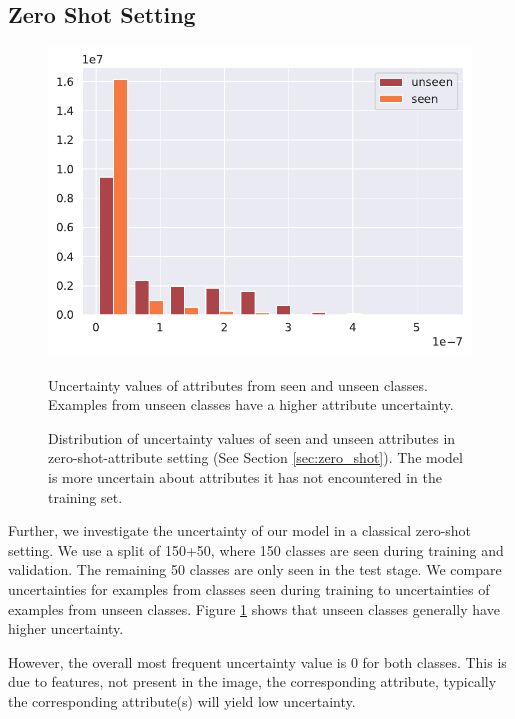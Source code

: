 \documentclass[a4paper,cleardoubleempty,BCOR1cm, 11pt]{report}
\begin{document}
\subsection{Zero Shot Setting}
\begin{figure}[t!]
	\centering
	\begin{minipage}[t]{0.45\textwidth}
		\centering
		\includegraphics[width=1\textwidth]{images/zero_shot_class_uncertainty_hist.pdf} 
		\caption{Uncertainty values of attributes from seen and unseen classes. Examples from unseen classes have a higher attribute uncertainty.}
		\label{fig:unseen_classes}
	\end{minipage}\hfill
	\begin{minipage}[t]{0.45\textwidth}
		\centering
		\caption{Distribution of uncertainty values of seen and unseen attributes in zero-shot-attribute setting (See Section \ref{sec:zero_shot}). The model is more uncertain about attributes it has not encountered in the training set.}
	\end{minipage}
\end{figure}
Further, we investigate the uncertainty of our model in a classical zero-shot setting. We use a split of 150+50, where 150 classes are seen during training and validation. The remaining 50 classes are only seen in the test stage. We compare uncertainties for examples from classes seen during training to uncertainties of examples from unseen classes. Figure \ref{fig:unseen_classes} shows that unseen classes generally have higher uncertainty.

However, the overall most frequent uncertainty value is 0 for both classes. This is due to features, not present in the image, the corresponding attribute, typically the corresponding attribute(s) will yield low uncertainty.
\end{document}
